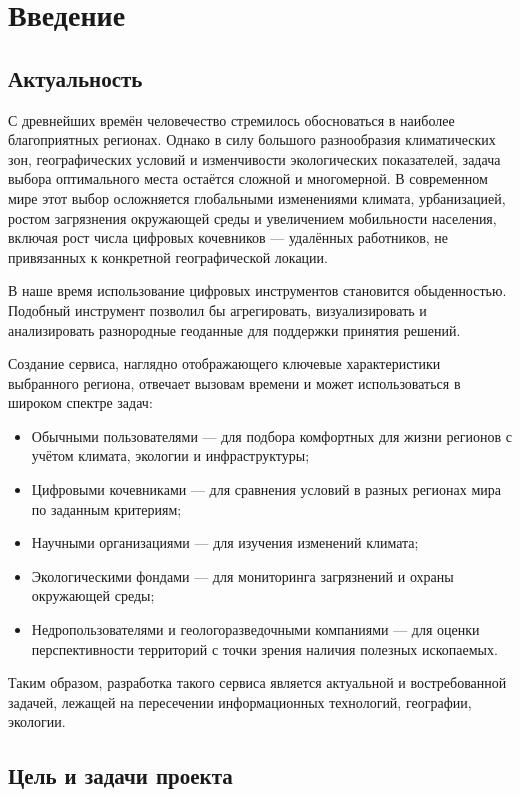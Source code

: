 \chapter{Введение}
\section{Актуальность}
С древнейших времён человечество стремилось обосноваться в наиболее благоприятных регионах.
Однако в силу большого разнообразия климатических зон, географических условий и изменчивости экологических показателей, задача выбора оптимального места остаётся сложной и многомерной. 
В современном мире этот выбор осложняется глобальными изменениями климата, урбанизацией, ростом загрязнения окружающей среды и увеличением мобильности населения, включая рост числа цифровых кочевников — удалённых работников, не привязанных к конкретной географической локации.

В наше время использование цифровых инструментов становится обыденностью. Подобный инструмент позволил бы агрегировать, визуализировать и анализировать разнородные геоданные для поддержки принятия решений. 

Создание сервиса, наглядно отображающего ключевые характеристики выбранного региона, отвечает вызовам времени и может использоваться в широком спектре задач:
\begin{itemize}
	\item Обычными пользователями — для подбора комфортных для жизни регионов с учётом климата, экологии и инфраструктуры;
	\item Цифровыми кочевниками — для сравнения условий в разных регионах мира по заданным критериям;
	\item Научными организациями — для изучения изменений климата;
	\item Экологическими фондами — для мониторинга загрязнений и охраны окружающей среды;
	\item Недропользователями и геологоразведочными компаниями — для оценки перспективности территорий с точки зрения наличия полезных ископаемых.
\end{itemize}

Таким образом, разработка такого сервиса является актуальной и востребованной задачей, лежащей на пересечении информационных технологий, географии, экологии.

\section{Цель и задачи проекта}

